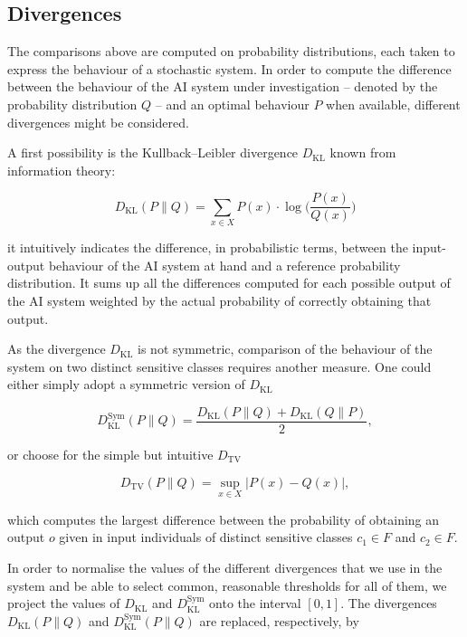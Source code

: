 \documentclass[
]{ceurart}
\begin{document}
\subsection{Divergences}

The comparisons above are computed on probability distributions, each taken to express the behaviour of a stochastic system. In order to compute the difference between the behaviour of the AI system under investigation -- denoted by the probability distribution $Q$ -- and an optimal behaviour $P$ when available, different divergences might be considered.

A first possibility is the Kullback–Leibler divergence $D_{\mathrm{KL}}$ \cite{dkl} known from information theory:

\[D_{\mathrm{KL}}(P\parallel Q)= \sum _{x\in X} P(x)\cdot \log \Big( \frac{P(x)}{Q(x)}\Big)\]

it intuitively indicates the difference, in probabilistic terms, between the input-output behaviour of the AI system at hand and a reference probability distribution. It sums up all the differences computed for each possible output of the AI system weighted by the actual probability of correctly obtaining that output.

As the divergence $D_{\mathrm{KL}}$ is not symmetric, comparison of the behaviour of the system on two distinct sensitive classes requires another measure. One could either simply adopt a symmetric version of $D_{\mathrm{KL}}$

\[D^{\mathrm{Sym}}_{\mathrm{KL}}(P\parallel Q)=\frac{D_{\mathrm{KL}}(P\parallel Q)+D_{\mathrm{KL}}(Q\parallel P)}{2},\]

%


or choose for the simple but intuitive $D_{\mathrm{TV}}$

\[D_{\mathrm{TV}}(P\parallel Q)= \sup _{x\in X} \vert P(x) - Q(x)\vert,\]

which computes the largest difference between the probability of obtaining an output $o$ given in input individuals of distinct sensitive classes $c_1\in F$ and $c_2\in F$.

In order to normalise the values of the different divergences that we use in the system and be able to select common, reasonable thresholds for all of them, we project the values of $D_{\mathrm{KL}}$ and $D^{\mathrm{Sym}}_{\mathrm{KL}}$ onto the interval $[0,1]$. The divergences $D_{\mathrm{KL}}(P\parallel Q)$ and $D^{\mathrm{Sym}}_{\mathrm{KL}}(P\parallel Q)$ are replaced, respectively, by
\end{document}
